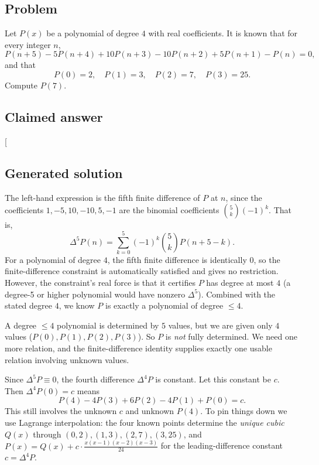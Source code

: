 \documentclass[
  11pt,
  letterpaper,
]{article}
\begin{document}
\subsection{Problem}\label{problem-1}

Let \(P(x)\) be a polynomial of degree \(4\) with real coefficients. It
is known that for every integer \(n\),
\[P(n+5) - 5P(n+4) + 10P(n+3) - 10P(n+2) + 5P(n+1) - P(n) = 0,\] and
that \[P(0)=2,\quad P(1)=3,\quad P(2)=7,\quad P(3)=25.\] Compute
\(P(7)\).

\subsection{Claimed answer}\label{claimed-answer-1}

{[}\boxed{241}{]}

\subsection{Generated solution}\label{generated-solution-1}

The left-hand expression is the fifth finite difference of \(P\) at
\(n\), since the coefficients \(1,-5,10,-10,5,-1\) are the binomial
coefficients \(\binom{5}{k}(-1)^k\). That is,
\[\Delta^5 P(n) = \sum_{k=0}^{5}(-1)^k\binom{5}{k}P(n+5-k).\] For a
polynomial of degree \(4\), the fifth finite difference is identically
\(0\), so the finite-difference constraint is automatically satisfied
and gives no restriction. However, the constraint's real force is that
it certifies \(P\) has degree at most \(4\) (a degree-5 or higher
polynomial would have nonzero \(\Delta^5\)). Combined with the stated
degree \(4\), we know \(P\) is exactly a polynomial of degree \(\le 4\).

A degree \(\le 4\) polynomial is determined by \(5\) values, but we are
given only \(4\) values (\(P(0),P(1),P(2),P(3)\)). So \(P\) is
\emph{not} fully determined. We need one more relation, and the
finite-difference identity supplies exactly one usable relation
involving unknown values.

Since \(\Delta^5 P \equiv 0\), the fourth difference \(\Delta^4 P\) is
constant. Let this constant be \(c\). Then \(\Delta^4 P(0)=c\) means
\[P(4)-4P(3)+6P(2)-4P(1)+P(0)=c.\] This still involves the unknown \(c\)
and unknown \(P(4)\). To pin things down we use Lagrange interpolation:
the four known points determine the \emph{unique cubic} \(Q(x)\) through
\((0,2),(1,3),(2,7),(3,25)\), and
\(P(x)=Q(x)+c\cdot\frac{x(x-1)(x-2)(x-3)}{24}\) for the
leading-difference constant \(c=\Delta^4 P\).
\end{document}
